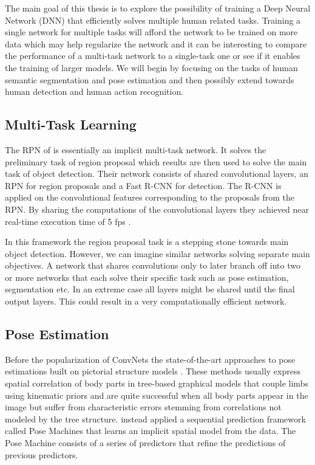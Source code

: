 \documentclass[a4paper,10pt]{article}
\begin{document}
The main goal of this thesis is to explore the possibility of training a Deep Neural Network (DNN) that efficiently solves multiple human related tasks.  Training a single network for multiple tasks will afford the network to be trained on more data which may help regularize the network and it can be interesting to compare the performance of a multi-task network to a single-task one or see if it enables the training of larger models.  We will begin by focusing on the tasks of human semantic segmentation and pose estimation and then possibly extend towards human detection and human action recognition.

\subsection{Multi-Task Learning}
\label{sec:background:multi}
The RPN of \cite{Ren2015} is essentially an implicit multi-task network.  It solves the preliminary task of region proposal which results are then used to solve the main task of object detection.  Their network consists of shared convolutional layers, an RPN for region proposals and a Fast R-CNN \cite{Girshick2015} for detection.  The R-CNN is applied on the convolutional features corresponding to the proposals from the RPN.  By sharing the computations of the convolutional layers they achieved near real-time execution time of 5 fps \cite{Ren2015}.  

In this framework the region proposal task is a stepping stone towards main object detection.  However, we can imagine similar networks solving separate main objectives.  A network that shares convolutions only to later branch off into two or more networks that each solve their specific task such as pose estimation, segmentation etc.  In an extreme case all layers might be shared until the final output layers.  This could result in a very computationally efficient network.


\subsection{Pose Estimation}
\label{sec:background:pose}
Before the popularization of ConvNets the state-of-the-art approaches to pose estimations built on pictorial structure models \cite{Felzenszwalb2005,Yang2011}.  These methods usually express spatial correlation of body parts in tree-based graphical models that couple limbs using kinematic priors and are quite successful when all body parts appear in the image but suffer from characteristic errors stemming from correlations not modeled by the tree structure.  \cite{Ramakrishna2014} instead applied a sequential prediction framework called Pose Machines that learns an implicit spatial model from the data.  The Pose Machine consists of a series of predictors that refine the predictions of previous predictors.
\end{document}
